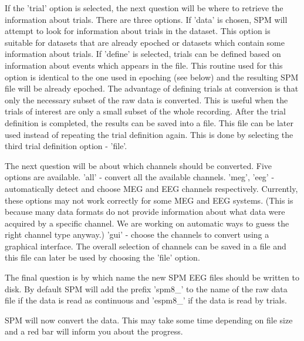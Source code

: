 If the 'trial' option is selected, the next question will be where to
retrieve the information about trials. There are three options. If
'data' is chosen, SPM will attempt to look for information about
trials in the 
dataset. This option is suitable for datasets that are already epoched
or datasets which contain some information about trials. If 'define'
is selected, trials can be defined based on information about events
which appears in the file. This routine used for this option is
identical to the one used in epoching (see below) and the resulting
SPM file will be already epoched. The advantage of defining trials at
conversion is that only the necessary subset of the raw data is
converted. This is useful when the trials of interest are only a small
subset of the whole recording. After the trial definition is
completed, the results can be saved into a file. This file can be
later used instead of repeating the trial definition again. This is
done by selecting the third trial definition option - 'file'. 

The next question will be about which channels should be
converted. Five options are available. 'all' - convert 
all the available channels. 'meg', 'eeg' - automatically detect and
choose MEG and EEG channels respectively. Currently, these options may
not work correctly for some MEG and EEG systems. (This is because many
data formats do not provide information about what data were acquired
by a specific channel. We are working on automatic ways to guess the
right channel type anyway.) 'gui' - choose the channels to
convert using a graphical interface. The overall selection of channels
can be saved in a file and this file can later be used by choosing the
'file' option.

The final question is by which name the new SPM EEG files should be
written to disk. By default SPM will add the prefix 'spm8\_' to the
name of the raw data file if the data is read as continuous and
'espm8\_' if the data is read by trials.  

SPM will now convert the data. This may take some time depending on
file size and a red bar will inform you about the progress.

